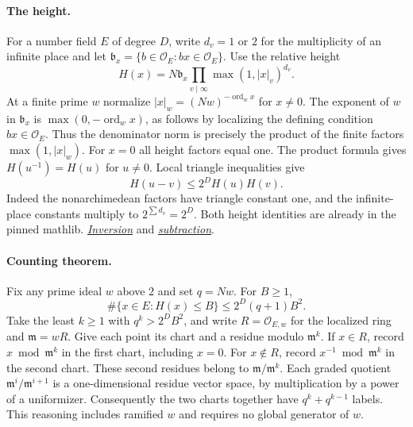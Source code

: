 \documentclass[11pt,letterpaper]{article}
\begin{document}
\paragraph{The height.}
For a number field $E$ of degree $D$, write $d_v=1$ or $2$ for the multiplicity of an infinite place and let $\mathfrak b_x=\{b\in\mathcal O_E:bx\in\mathcal O_E\}$. Use the relative height
\[
 H(x)=N\mathfrak b_x\prod_{v\mid\infty}\max(1,|x|_v)^{d_v}.
\]
At a finite prime $w$ normalize $|x|_w=(Nw)^{-\operatorname{ord}_w x}$ for $x\ne0$. The exponent of $w$ in $\mathfrak b_x$ is $\max(0,-\operatorname{ord}_w x)$, as follows by localizing the defining condition $bx\in\mathcal O_E$. Thus the denominator norm is precisely the product of the finite factors $\max(1,|x|_w)$. For $x=0$ all height factors equal one. The product formula gives $H(u^{-1})=H(u)$ for $u\ne0$. Local triangle inequalities give
\[
 H(u-v)\le 2^{D}H(u)H(v).
\]
Indeed the nonarchimedean factors have triangle constant one, and the infinite-place constants multiply to $2^{\sum d_v}=2^D$. Both height identities are already in the pinned mathlib.
\href{https://github.com/leanprover-community/mathlib4/blob/56a005855ea17e0b0958f73ec801ae140b0a1679/Mathlib/NumberTheory/Height/Basic.lean#L596}{\textit{Inversion}} and
\href{https://github.com/leanprover-community/mathlib4/blob/56a005855ea17e0b0958f73ec801ae140b0a1679/Mathlib/NumberTheory/Height/Basic.lean#L915}{\textit{subtraction}}.

\paragraph{Counting theorem.}
Fix any prime ideal $w$ above $2$ and set $q=Nw$. For $B\ge1$,
\begin{equation}\label{eq:freq-height-count}
 \#\{x\in E:H(x)\le B\}\le 2^D(q+1)B^2 .
\end{equation}
Take the least $k\ge1$ with $q^k>2^D B^2$, and write $R=\mathcal O_{E,w}$ for the localized ring and $\mathfrak m=wR$. Give each point its chart and a residue modulo $\mathfrak m^k$. If $x\in R$, record $x\bmod\mathfrak m^k$ in the first chart, including $x=0$. For $x\notin R$, record $x^{-1}\bmod\mathfrak m^k$ in the second chart. These second residues belong to $\mathfrak m/\mathfrak m^k$. Each graded quotient $\mathfrak m^i/\mathfrak m^{i+1}$ is a one-dimensional residue vector space, by multiplication by a power of a uniformizer. Consequently the two charts together have $q^k+q^{k-1}$ labels. This reasoning includes ramified $w$ and requires no global generator of $w$.
\end{document}

